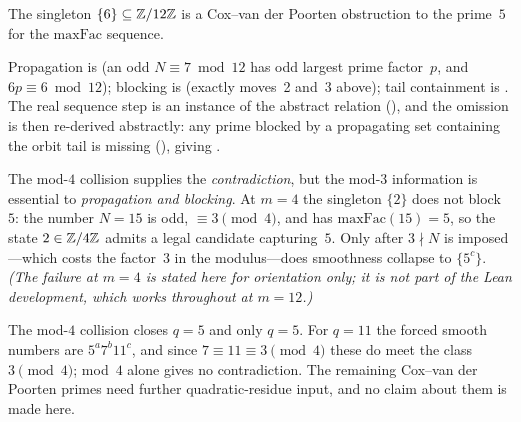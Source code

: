 \begin{keyresult}
\begin{theorem}
\label{thm:max-obstruction-inhabited}
The singleton $\{6\} \subseteq \mathbb{Z}/12\mathbb{Z}$ is a Cox--van der Poorten
obstruction to the prime~$5$ for the $\mathrm{maxFac}$ sequence.
\end{theorem}
\end{keyresult}

\noindent
Propagation is
(an odd $N \equiv 7 \bmod 12$ has odd largest prime factor~$p$, and
$6p \equiv 6 \bmod 12$); blocking is
(exactly moves~2 and~3 above); tail containment is
.  The real sequence
step is an instance of the abstract relation
(), and the
omission is then re-derived abstractly: any prime blocked by a
propagating set containing the orbit tail is missing
(), giving
.

\begin{remark}
\label{rem:mod-twelve}
The mod-$4$ collision supplies the \emph{contradiction}, but the mod-$3$
information is essential to \emph{propagation and blocking}.  At $m = 4$
the singleton $\{2\}$ does not block~$5$: the number $N = 15$ is odd,
$\equiv 3 \pmod 4$, and has $\mathrm{maxFac}(15) = 5$, so the state
$2 \in \mathbb{Z}/4\mathbb{Z}$ admits a legal candidate capturing~$5$.  Only after
$3 \nmid N$ is imposed---which costs the factor~$3$ in the
modulus---does smoothness collapse to $\{5^c\}$.  \emph{(The failure at
$m=4$ is stated here for orientation only; it is not part of the Lean
development, which works throughout at $m = 12$.)}
\end{remark}

\begin{remark}
\label{rem:reach-mod-four}
The mod-$4$ collision closes $q = 5$ and only $q = 5$.  For $q = 11$ the
forced smooth numbers are $5^a 7^b 11^c$, and since
$7 \equiv 11 \equiv 3 \pmod 4$ these do meet the class $3 \pmod 4$;
mod~$4$ alone gives no contradiction.  The remaining Cox--van der
Poorten primes need further quadratic-residue input, and no claim about
them is made here.
\end{remark}

